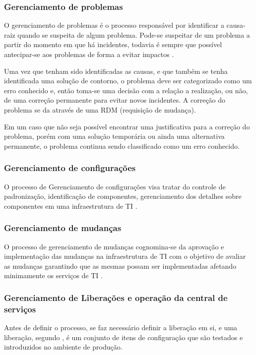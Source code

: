 \subsubsection{Gerenciamento de problemas}
O gerenciamento de problemas é o processo responsável por identificar a causa-raiz quando se suspeita de algum problema. Pode-se suspeitar de um problema a partir do momento em que há incidentes, todavia é sempre que possível antecipar-se aos problemas de forma a evitar impactos \citep{ogc_itil}. 

Uma vez que tenham sido identificadas as causas, e que também se tenha identificada uma solução de contorno, o problema deve ser categorizado como um erro conhecido e, então toma-se uma decisão com a relação a realização, ou não, de uma correção permanente para evitar novos incidentes. A correção do problema se da através de uma RDM (requisição de mudança).

Em um caso que não seja possível encontrar uma justificativa para a correção do problema, porém com uma solução temporária ou ainda uma alternativa permanente, o problema continua sendo classificado como um erro conhecido.

\subsubsection{Gerenciamento de configurações}
O processo de Gerenciamento de configurações visa tratar do controle de padronização, identificação de componentes, gerenciamento dos detalhes sobre componentes em uma infraestrutura de TI \citep{ogc_itil}.

\subsubsection{Gerenciamento de mudanças}
O processo de gerenciamento de mudanças cognomina-se da aprovação e implementação das mudanças na infraestrutura de TI com o objetivo de avaliar as mudanças garantindo que as mesmas possam ser implementadas afetando minimamente os serviços de TI \citep{ogc_itil}. 

\subsubsection{Gerenciamento de Liberações e operação da central de serviços}
Antes de definir o processo, se faz necessário definir a liberação em si, e uma liberação, segundo \citet{vanharen_2006}, é um conjunto de itens de configuração que são testados e introduzidos no ambiente de produção.

